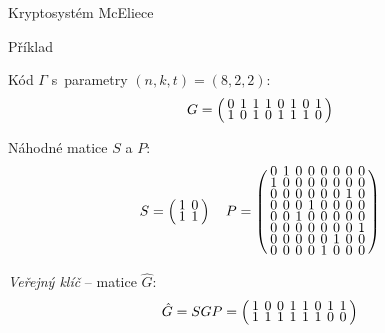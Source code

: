 \documentclass{beamer}
\begin{document}
\begin{frame}{Kryptosystém McEliece}

    \begin{exampleblock}{Příklad}

        Kód $\Gamma$ s~parametry $(n,k,t)=(8,2,2)$:
        $$
        \arraycolsep=2pt
        \def\arraystretch{0.5}
            G = \left(
                \begin{array}{*{8}{c}}
                    0 & 1 & 1 & 1 & 0 & 1 & 0 & 1 \\
                    1 & 0 & 1 & 0 & 1 & 1 & 1 & 0 \\
                \end{array}
            \right)
        $$

    \pause
        Náhodné matice $S$ a $P$:
        $$
        \arraycolsep=2pt
        \def\arraystretch{0.5}
            S = \left(
                \begin{array}{*{2}{c}}
                    1 & 0 \\
                    1 & 1 \\
                \end{array}
            \right)
            \quad
            P = \left(
                \begin{array}{*{8}{c}}
                    0 & 1 & 0 & 0 & 0 & 0 & 0 & 0 \\
                    1 & 0 & 0 & 0 & 0 & 0 & 0 & 0 \\
                    0 & 0 & 0 & 0 & 0 & 0 & 1 & 0 \\
                    0 & 0 & 0 & 1 & 0 & 0 & 0 & 0 \\
                    0 & 0 & 1 & 0 & 0 & 0 & 0 & 0 \\
                    0 & 0 & 0 & 0 & 0 & 0 & 0 & 1 \\
                    0 & 0 & 0 & 0 & 0 & 1 & 0 & 0 \\
                    0 & 0 & 0 & 0 & 1 & 0 & 0 & 0 \\
                \end{array}
            \right)
        $$

    \pause
        \emph{Veřejný klíč} -- matice $\hat{G}$:
        $$
        \arraycolsep=2pt
        \def\arraystretch{0.5}
            \hat{G} = S G P  = \left(
                \begin{array}{*{8}{c}}
                    1 & 0 & 0 & 1 & 1 & 0 & 1 & 1 \\
                    1 & 1 & 1 & 1 & 1 & 1 & 0 & 0 \\
                \end{array}
            \right)
        $$

    \end{exampleblock}

\end{frame}
\end{document}
